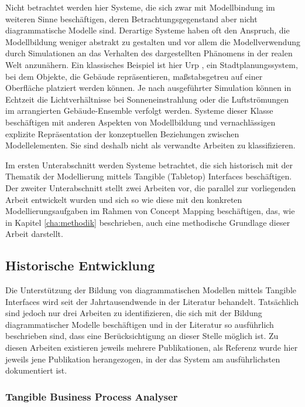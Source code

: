 Nicht betrachtet werden hier Systeme, die sich zwar mit Modellbindung im weiteren Sinne beschäftigen, deren Betrachtungsgegenstand aber nicht diagrammatische Modelle sind. Derartige Systeme haben oft den Anspruch, die Modellbildung weniger abstrakt zu gestalten und vor allem die Modellverwendung durch Simulationen an das Verhalten des dargestellten Phänomens in der realen Welt anzunähern. Ein klassisches Beispiel ist hier Urp \citep{Underkoffler99}, ein Stadtplanungssystem, bei dem Objekte, die Gebäude repräsentieren, maßstabsgetreu auf einer Oberfläche platziert werden können. Je nach ausgeführter Simulation können in Echtzeit die Lichtverhältnisse bei Sonneneinstrahlung oder die Luftströmungen im arrangierten Gebäude-Ensemble verfolgt werden. Systeme dieser Klasse beschäftigen mit anderen Aspekten von Modellbildung und vernachlässigen explizite Repräsentation der konzeptuellen Beziehungen zwischen Modellelementen. Sie sind deshalb nicht als verwandte Arbeiten zu klassifizieren.

Im ersten Unterabschnitt werden Systeme betrachtet, die sich historisch mit der Thematik der Modellierung mittels Tangible (Tabletop) Interfaces beschäftigen. Der zweiter Unterabschnitt stellt zwei Arbeiten vor, die parallel zur vorliegenden Arbeit entwickelt wurden und sich so wie diese mit den konkreten Modellierungsaufgaben im Rahmen von Concept Mapping beschäftigen, das, wie in Kapitel \ref{cha:methodik} beschrieben, auch eine methodische Grundlage dieser Arbeit darstellt. 

\subsection{Historische Entwicklung} %
\label{sub:historische_entwicklung}

Die Unterstützung der Bildung von diagrammatischen Modellen mittels Tangible Interfaces wird seit der Jahrtausendwende in der Literatur behandelt. Tatsächlich sind jedoch nur drei Arbeiten zu identifizieren, die sich mit der Bildung diagrammatischer Modelle beschäftigen und in der Literatur so ausführlich beschrieben sind, dass eine Berücksichtigung an dieser Stelle möglich ist. Zu diesen Arbeiten existieren jeweils mehrere Publikationen, als Referenz wurde hier jeweils jene Publikation herangezogen, in der das System am ausführlichsten dokumentiert ist.

\subsubsection{Tangible Business Process Analyser} %
\label{ssub:tangible_business_process_analyser}

